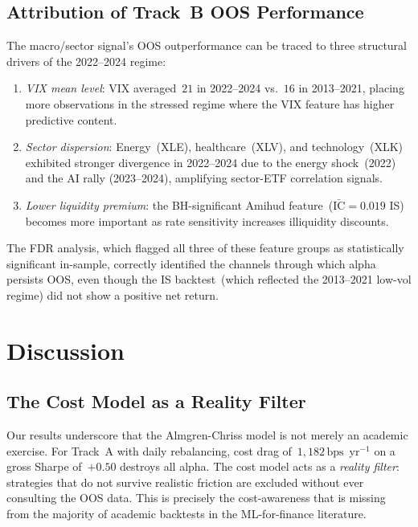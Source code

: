 \documentclass[journal]{IEEEtran}
\newcommand{\IC}{\mathrm{IC}}
\newcommand{\bps}{\,\mathrm{bps}}
\begin{document}
\subsection{Attribution of Track~B OOS Performance}
The macro/sector signal's OOS outperformance can be traced to three
structural drivers of the 2022--2024 regime:
\begin{enumerate}
  \item \emph{VIX mean level}: VIX averaged~$21$ in 2022--2024
        vs.\ $16$ in 2013--2021, placing more observations in the
        stressed regime where the VIX feature has higher predictive
        content.
  \item \emph{Sector dispersion}: Energy~(XLE), healthcare~(XLV),
        and technology~(XLK) exhibited stronger divergence in
        2022--2024 due to the energy shock~(2022) and the AI rally
        (2023--2024), amplifying sector-ETF correlation signals.
  \item \emph{Lower liquidity premium}: the BH-significant Amihud
        feature~($\bar{\IC} = 0.019$ IS) becomes more important
        as rate sensitivity increases illiquidity discounts.
\end{enumerate}
The FDR analysis, which flagged all three of these feature groups
as statistically significant in-sample, correctly identified the
channels through which alpha persists OOS, even though the IS
backtest~(which reflected the 2013--2021 low-vol regime) did not
show a positive net return.

\section{Discussion}
\label{sec:discussion}

\subsection{The Cost Model as a Reality Filter}
Our results underscore that the Almgren-Chriss model is not merely
an academic exercise.
For Track~A with daily rebalancing, cost drag of~$1{,}182\bps$~yr$^{-1}$
on a gross Sharpe of~$+0.50$ destroys all alpha.
The cost model acts as a \emph{reality filter}: strategies that do
not survive realistic friction are excluded without ever consulting
the OOS data.
This is precisely the cost-awareness that is missing from the
majority of academic backtests in the ML-for-finance literature.
\end{document}
